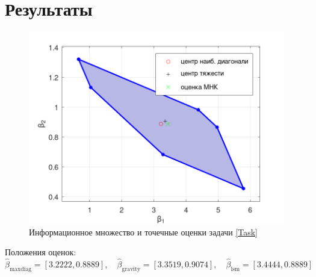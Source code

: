 \section{Результаты}
\begin{figure}[H]\label{InfSet}
\centering
\includegraphics[width=1\textwidth]{Graphics/InformSet.png}
\caption{Информационное множество и точечные оценки задачи \eqref{Task}} 
\end{figure}

Положения оценок:
\begin{equation}
\hat{\beta}_{\mathrm{maxdiag}}=[3.2222, 0.8889], \quad \hat{\beta}_{\mathrm{gravity}} = [3.3519,   0.9074], \quad
\hat{\beta}_{\mathrm{lsm}} = [3.4444,   0.8889]
\end{equation}

